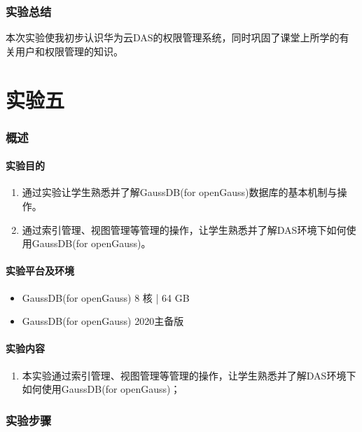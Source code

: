 \documentclass[lang=cn,11pt,a4paper,cite=authornum]{paper}
\begin{document}
\section{实验总结}

本次实验使我初步认识华为云DAS的权限管理系统，同时巩固了课堂上所学的有关用户和权限管理的知识。

\part{实验五}

\section{概述}

\subsection{实验目的}

\begin{enumerate}
    \item 通过实验让学生熟悉并了解GaussDB(for openGauss)数据库的基本机制与操作。
    \item 通过索引管理、视图管理等管理的操作，让学生熟悉并了解DAS环境下如何使用GaussDB(for openGauss)。
\end{enumerate}

\subsection{实验平台及环境}

\begin{itemize}
    \item GaussDB(for openGauss) 8 核 | 64 GB
    \item GaussDB(for openGauss) 2020主备版
\end{itemize}

\subsection{实验内容}

\begin{enumerate}
    \item 本实验通过索引管理、视图管理等管理的操作，让学生熟悉并了解DAS环境下如何使用GaussDB(for openGauss)；
\end{enumerate}

\section{实验步骤}
\end{document}

